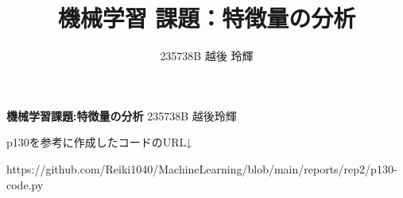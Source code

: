 \documentclass[a4paper,11pt,titlepage]{jsarticle}
\title{機械学習 課題：特徴量の分析}
\author{235738B 越後 玲輝}
\begin{document}
\textbf{機械学習課題:特徴量の分析} \qquad \qquad\qquad\qquad \qquad\qquad\qquad\qquad235738B 越後玲輝

p130を参考に作成したコードのURL↓

https://github.com/Reiki1040/MachineLearning/blob/main/reports/rep2/p130-code.py
\end{document}
